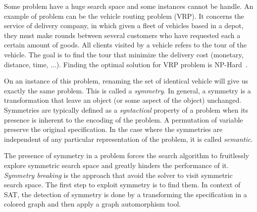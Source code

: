 Some problem have a huge search space and some instances cannot be handle.
An example of problem can be the vehicle routing problem (VRP).
It concerns the service of delivery company, in which
given a fleet of vehicles based in a depot, they must make rounds between several customers  who have requested
each a certain amount of goods. All clients visited by a vehicle refers to the tour of the vehicle. 
The goal is to find the tour that minimize the delivery cost (monetary, distance, time, ...).
Finding the optimal solution for VRP problem is NP-Hard~\cite{toth2002vehicle}.

On an instance of this problem, renaming the set of identical vehicle will give us exactly the same problem.
This is called a \textit{symmetry}. In general, a symmetry is a transformation that leave an object (or some aspect of the object) unchanged. Symmetries are typically defined as a \textit{syntactical} property of a problem when its presence is inherent to the encoding of the problem. A permutation of variable preserve the original specification. In the case where the symmetries are independent of any 
particular representation of the problem, it is called \textit{semantic}.


The presence of symmetry in a problem forces the search algorithm to fruitlessly explore symmetric
search space and greatly hinders the performance of it. \textit{Symmetry breaking} is the approach that
avoid the solver to visit symmetric search space. The first step to exploit symmetry is to find them.
In context of SAT, the detection of symmetry is done by a transforming the specification
in a colored graph and then apply a graph automorphism tool.


%
%
%
%
%
%
%
%
%



